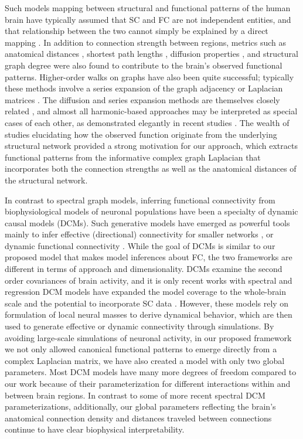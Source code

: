 Such models mapping between structural and functional patterns of the human brain have typically assumed that SC and FC are not independent entities, and that relationship between the two cannot simply be explained by a direct mapping \cite{honey_predicting_2009}. In addition to connection strength between regions, metrics such as anatomical distances \cite{alexander-bloch_anatomical_2013}, shortest path lengths \cite{goni_resting-brain_2014}, diffusion properties \cite{Abdelnour2018, Kuceyeski2016}, and structural graph degree \cite{stam_relation_2016} were also found to contribute to the brain's observed functional patterns. Higher-order walks on graphs have also been quite successful; typically these methods involve a series expansion of the graph adjacency or Laplacian matrices \cite{Meier2016, Becker2018}. The diffusion and series expansion methods are themselves closely related \cite{robinson_eigenmodes_2016}, and almost all harmonic-based approaches may be interpreted as special cases of each other, as demonstrated elegantly in recent studies \cite{deslauriers2020, tewarie2020}.  The wealth of studies elucidating how the observed function originate from the underlying structural network provided a strong motivation for our approach, which extracts functional patterns from the informative complex graph Laplacian that incorporates both the connection strengths as well as the anatomical distances of the structural network. 

In contrast to spectral graph models, inferring functional connectivity from biophysiological models of neuronal populations have been a specialty of dynamic causal models (DCMs). Such generative models have emerged as powerful tools mainly to infer effective (directional) connectivity for smaller networks \cite{daunizeau_dynamic_2009, stephan_nonlinear_2008, pinotsis_linking_2017, razi_construct_2015, park_dynamic_2018}, or dynamic functional connectivity \cite{preti_dynamic_2017, van_de_steen_dynamic_2019}. While the goal of DCMs is similar to our proposed model that makes model inferences about FC, the two frameworks are different in terms of approach and dimensionality. DCMs examine the second order covariances of brain activity, and it is only recent works with spectral and regression DCM models have expanded the model coverage to the whole-brain scale and the potential to incorporate SC data \cite{frassle_generative_2018, frassle_regression_2017, razi_large-scale_2017}. However, these models rely on formulation of local neural masses to derive dynamical behavior, which are then used to generate effective or dynamic connectivity through simulations. By avoiding large-scale simulations of neuronal activity, in our proposed framework we not only allowed canonical functional patterns to emerge directly from a complex Laplacian matrix, we have also created a model with only two global parameters. Most DCM models have many more degrees of freedom compared to our work because of their parameterization for different interactions within and between brain regions. In contrast to some of more recent spectral DCM parameterizations, additionally, our global parameters reflecting the brain's anatomical connection density and distances traveled between connections continue to have clear biophysical interpretability.

